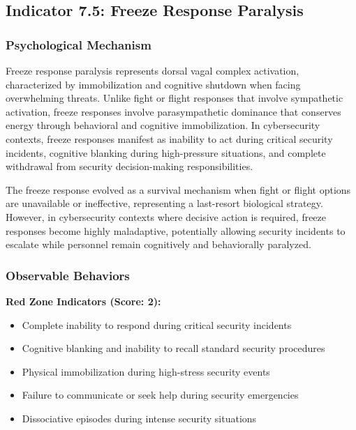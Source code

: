 \documentclass[11pt,a4paper]{article}
\begin{document}
\subsection{Indicator 7.5: Freeze Response Paralysis}

\subsubsection{Psychological Mechanism}

Freeze response paralysis represents dorsal vagal complex activation, characterized by immobilization and cognitive shutdown when facing overwhelming threats\cite{porges2011}. Unlike fight or flight responses that involve sympathetic activation, freeze responses involve parasympathetic dominance that conserves energy through behavioral and cognitive immobilization. In cybersecurity contexts, freeze responses manifest as inability to act during critical security incidents, cognitive blanking during high-pressure situations, and complete withdrawal from security decision-making responsibilities\cite{immobilization2022}.

The freeze response evolved as a survival mechanism when fight or flight options are unavailable or ineffective, representing a last-resort biological strategy\cite{marx2008}. However, in cybersecurity contexts where decisive action is required, freeze responses become highly maladaptive, potentially allowing security incidents to escalate while personnel remain cognitively and behaviorally paralyzed\cite{incident2023}.

\subsubsection{Observable Behaviors}

\textbf{Red Zone Indicators (Score: 2):}
\begin{itemize}
\item Complete inability to respond during critical security incidents
\item Cognitive blanking and inability to recall standard security procedures
\item Physical immobilization during high-stress security events
\item Failure to communicate or seek help during security emergencies
\item Dissociative episodes during intense security situations
\end{itemize}
\end{document}
